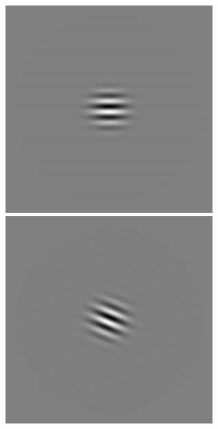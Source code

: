 \begin{figure}[ht]
\begin{center}
 \includegraphics[width=\columnwidth/9]{ch4/figures/rGabor3_4.jpg}
 \includegraphics[width=\columnwidth/9]{ch4/figures/rGabor3_5.jpg}

\end{center}
\end{figure}
